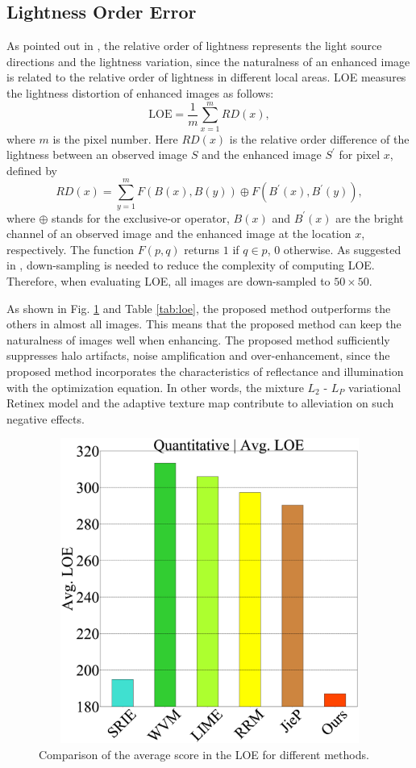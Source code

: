 \subsection{Lightness Order Error}
As pointed out in \cite{loe}, the relative order of lightness represents the light source directions and the lightness variation, since the naturalness of an enhanced image is related to the relative order of lightness in different local areas. LOE measures the lightness distortion of enhanced images as follows:
\begin{equation}
\mbox{LOE} = \frac{1}{m} \sum_{x=1}^{m}{RD(x)}, \label{eq:loe}
\end{equation}
where $m$ is the pixel number. Here $RD(x)$ is the relative order difference of the lightness between an observed image $S$ and the enhanced image $S^{'}$ for pixel $x$, defined by
\begin{equation}
RD(x) = \sum_{y=1}^{m}F(B(x), B(y)) \oplus F(B^{'}(x), B^{'}(y)), \label{eq:rd}
\end{equation}
where $\oplus$ stands for the exclusive-or operator, $B(x)$ and $B^{'}(x)$ are the bright channel of an observed image and the enhanced image at the location $x$, respectively. The function $F(p, q)$ returns $1$ if $q \in p$, $0$ otherwise. As suggested in \cite{lime}, down-sampling is needed to reduce the complexity of computing LOE. Therefore, when evaluating LOE, all images are down-sampled to $50 \times 50$.\par
As shown in Fig. \ref{fig:loe} and Table \ref{tab:loe}, the proposed method outperforms the others in almost all images. This means that the proposed method can keep the naturalness of images well when enhancing. The proposed method sufficiently suppresses halo artifacts, noise amplification and over-enhancement, since the proposed method incorporates the characteristics of reflectance and illumination with the optimization equation. In other words, the mixture $L_{2}$ - $L_{P}$ variational Retinex model and the adaptive texture map contribute to alleviation on such negative effects. 
\begin{figure}[tb]
	\centering
	\includegraphics[width=125mm, height=100mm]{images/experiment/quantitative/loe.eps}
	\caption{Comparison of the average score in the LOE for different methods.} \label{fig:loe}
\end{figure}
